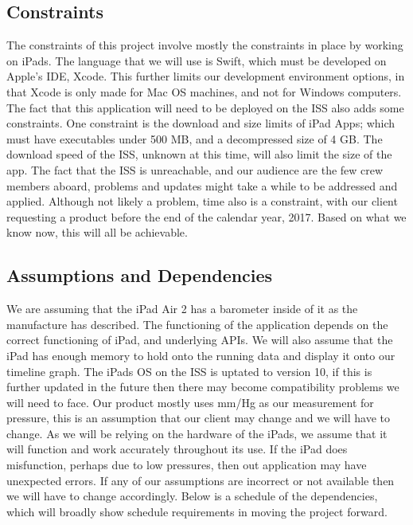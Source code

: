 \documentclass[onecolumn, draftclsnofoot,10pt, compsoc]{IEEEtran}
\begin{document}
\subsection{Constraints}
The constraints of this project involve mostly the constraints in place by working on iPads.
The language that we will use is Swift, which must be developed on Apple's IDE, Xcode.
This further limits our development environment options, in that Xcode is only made for Mac OS machines, and not for Windows computers.
The fact that this application will need to be deployed on the ISS also adds some constraints.
One constraint is the download and size limits of iPad Apps; which must have executables under 500 MB, and a decompressed size of 4 GB.
The download speed of the ISS, unknown at this time, will also limit the size of the app.
The fact that the ISS is unreachable, and our audience are the few crew members aboard, problems and updates might take a while to be addressed and applied.
Although not likely a problem, time also is a constraint, with our client requesting a product before the end of the calendar year, 2017.
Based on what we know now, this will all be achievable.

\subsection{Assumptions and Dependencies}
We are assuming that the iPad Air 2 has a barometer inside of it as the manufacture has described.
The functioning of the application depends on the correct functioning of iPad, and underlying APIs.
We will also assume that the iPad has enough memory to hold onto the running data and display it onto our timeline graph.
The iPads OS on the ISS is uptated to version 10, if this is further updated in the future then there may become compatibility problems we will need to face.
Our product mostly uses mm/Hg as our measurement for pressure, this is an assumption that our client may change and we will have to change.
As we will be relying on the hardware of the iPads, we assume that it will function and work accurately throughout its use.
If the iPad does misfunction, perhaps due to low pressures, then out application may have unexpected errors.
If any of our assumptions are incorrect or not available then we will have to change accordingly.
Below is a schedule of the dependencies, which will broadly show schedule requirements in moving the project forward.
\end{document}
